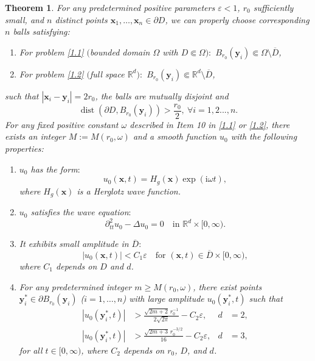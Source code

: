 \documentclass[11pt,reqno,oneside]{amsart}
\numberwithin{equation}{section}
\newtheorem{theorem}{Theorem}[section]
\theoremstyle{definition}
\theoremstyle{remark}
\numberwithin{equation}{section}
\begin{document}
	\begin{theorem}\label{thm:main_result}
		For any predetermined positive parameters $\varepsilon < 1$, $r_0$ sufficiently small, and $n$ distinct points $\mathbf{x}_1,\dots,\mathbf{x}_n \in \partial D$, we can properly choose corresponding $n$ balls satisfying:
		\begin{enumerate}
			\renewcommand{\labelenumi}{(\roman{enumi})}
			\item For problem \eqref{1.1} $($bounded domain $\Omega$ with $D \Subset \Omega):$ $B_{r_0}(\mathbf{y}_i) \Subset \Omega \setminus \overline{D}$,
			\item For problem \eqref{1.2} $($full space $\mathbb{R}^d ):$ $B_{r_0}(\mathbf{y}_i) \Subset \mathbb{R}^d \setminus \overline{D}$,
		\end{enumerate}
		such that $|\mathbf{x}_i - \mathbf{y}_i| = 2r_0$, the balls are mutually disjoint and
		$$
		\operatorname{dist}(\partial D, B_{r_0}(\mathbf{y}_i))>\frac{r_0}{2},\ \forall i=1,2...,n.
		$$
		For any fixed positive constant $\omega$ described in Item 10 in \eqref{1.1} or \eqref{1.2},  there exists an integer $M := M(r_0,\omega)$ and a smooth function $u_0$ with the following properties:
		\begin{enumerate}
			\item $u_0$ has the form$:$
			\begin{equation*}
				u_0(\mathbf{x},t) = H_g(\mathbf{x})\exp(\mathrm{i}\omega t),
			\end{equation*}
			where $ H_g(\mathbf{x})$ is a Herglotz wave function. 
			
			\item $u_0$ satisfies the wave equation$:$
			\[
			\partial_{tt}^2 u_0 - \Delta u_0 = 0 \quad \text{in } \mathbb{R}^d \times [0,\infty).
			\]
			
			\item It exhibits small amplitude in $\overline{D}:$
			\begin{equation}\label{u0 smalles}
				|u_0(\mathbf{x},t)| < C_1\varepsilon \quad \text{for } (\mathbf{x},t) \in \overline{D} \times [0,\infty),
			\end{equation}
			where $C_1$ depends on $D$ and $d$.
			
			\item For any predetermined integer $m \geqslant M(r_0,\omega)$, there exist points $\mathbf{y}^*_i \in \partial B_{r_0}(\mathbf{y}_i)$  ($i=1,\dots,n$) with large amplitude $u_0(\mathbf{y}^*_i,t)$ such that
			\begin{align}
				|u_0(\mathbf{y}^*_i,t)| &> \frac{\sqrt{2m+2}\,r_0^{-1}}{2\sqrt{2\pi}} - C_2\varepsilon, & d &= 2, \label{2 d} \\
				|u_0(\mathbf{y}^*_i,t)| &> \frac{\sqrt{2m+3}\,r_0^{-3/2}}{16} - C_2\varepsilon, & d &= 3, \label{3 d}
			\end{align}
			for all $t \in [0,\infty)$, where $C_2$ depends on $r_0$, $D$, and $d$.
		\end{enumerate}
	\end{theorem}
	
\end{document}
